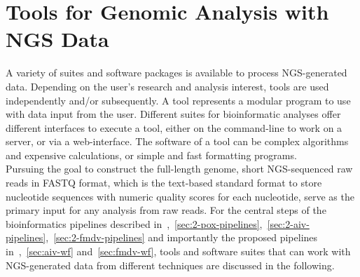 \section{Tools for Genomic Analysis with NGS Data}
A variety of suites and software packages is available to process \ac{NGS}-generated data. Depending on the user's research and analysis interest, tools are used independently and/or subsequently. A tool represents a modular program to use with data input from the user. Different suites for bioinformatic analyses offer different interfaces to execute a tool, either on the command-line to work on a server, or via a web-interface. The software of a tool can be complex algorithms and expensive calculations, or simple and fast formatting programs. \\
Pursuing the goal to construct the full-length genome, short \ac{NGS}-sequenced raw reads in FASTQ format, which is the text-based standard format to store nucleotide sequences with numeric quality scores for each nucleotide, serve as the primary input for any analysis from raw reads. For the central steps of the bioinformatics pipelines described in~,~\ref{sec:2-pox-pipelines},~\ref{sec:2-aiv-pipelines},~\ref{sec:2-fmdv-pipelines} and importantly the proposed pipelines in~,~\ref{sec:aiv-wf} and~\ref{sec:fmdv-wf}, tools and software suites that can work with \ac{NGS}-generated data from different techniques are discussed in the following. 

